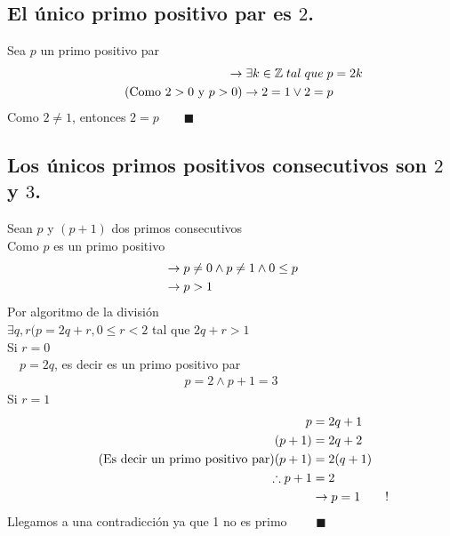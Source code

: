 \section{}
    \subsection{El único primo positivo par es $2$.}
    Sea $p$ un primo positivo par
    \begin{align}
        \notag \rightarrow \exists k \in \mathbb{Z} \; tal \; que \; p &= 2k \\
        \tag{Como $2 > 0$ y $p > 0$} \rightarrow 2 = 1 \vee 2 = p
    \end{align}
    Como $2 \neq 1$, entonces $ 2 = p \qquad \blacksquare$
    \subsection{Los únicos primos positivos consecutivos son $2$ y $3$.}
        Sean $p$ y $(p+1)$ dos primos consecutivos \\
        Como $p$ es un primo positivo
        \begin{align}
            \notag &\rightarrow p \neq 0 \wedge p \neq 1 \wedge 0 \leq p \\
            \notag &\rightarrow p > 1
        \end{align}
        Por algoritmo de la división \\
        $\exists q,r (p = 2q+r, 0 \leq r < 2$ tal que $2q+r > 1$ \\
        Si $r = 0$\\
        $\quad p = 2q$, es decir es un primo positivo par
        \begin{align}
            \tag{Por 1.1} p = 2 \wedge p+1=3
        \end{align}
        Si $r=1$
        \begin{align}
            \notag p &= 2q+1 \\
            \notag (p+1) &= 2q+2 \\
            \tag{Es decir un primo positivo par} (p+1) &= 2(q+1) \\
            \notag \therefore p+1 &= 2 \\
            \notag &\rightarrow p= 1 \qquad !
        \end{align}
        Llegamos a una contradicción ya que 1 no es primo $\qquad \blacksquare$

